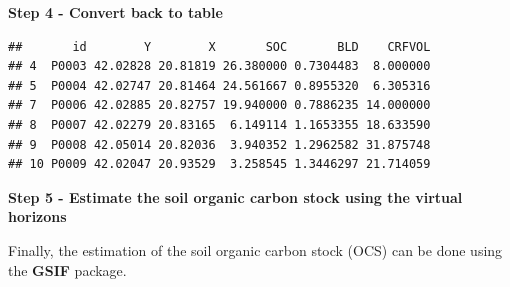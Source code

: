 \documentclass[10pt,b5paper,]{book}
\newenvironment{Shaded}{\begin{snugshade}}{\end{snugshade}}
\newcommand{\CommentTok}[1]{\textcolor[rgb]{0.56,0.35,0.01}{\textit{#1}}}
\newcommand{\DataTypeTok}[1]{\textcolor[rgb]{0.13,0.29,0.53}{#1}}
\newcommand{\DecValTok}[1]{\textcolor[rgb]{0.00,0.00,0.81}{#1}}
\newcommand{\KeywordTok}[1]{\textcolor[rgb]{0.13,0.29,0.53}{\textbf{#1}}}
\newcommand{\NormalTok}[1]{#1}
\newcommand{\OperatorTok}[1]{\textcolor[rgb]{0.81,0.36,0.00}{\textbf{#1}}}
\newcommand{\StringTok}[1]{\textcolor[rgb]{0.31,0.60,0.02}{#1}}
\theoremstyle{definition}
\theoremstyle{definition}
\theoremstyle{definition}
\theoremstyle{remark}
\begin{document}
\textbf{Step 4 - Convert back to table}

\begin{Shaded}
\end{Shaded}

\begin{verbatim}
##       id        Y        X       SOC       BLD    CRFVOL
## 4  P0003 42.02828 20.81819 26.380000 0.7304483  8.000000
## 5  P0004 42.02747 20.81464 24.561667 0.8955320  6.305316
## 7  P0006 42.02885 20.82757 19.940000 0.7886235 14.000000
## 8  P0007 42.02279 20.83165  6.149114 1.1653355 18.633590
## 9  P0008 42.05014 20.82036  3.940352 1.2962582 31.875748
## 10 P0009 42.02047 20.93529  3.258545 1.3446297 21.714059
\end{verbatim}

\textbf{Step 5 - Estimate the soil organic carbon stock using the
virtual horizons}

Finally, the estimation of the soil organic carbon stock (OCS) can be
done using the \textbf{GSIF} package.
\end{document}
